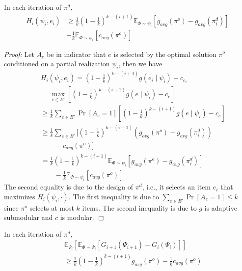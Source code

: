 \documentclass[twoside,leqno,twocolumn]{article}
\begin{document}
\begin{lemma}
\label{lem:a2}
In each iteration of $\pi^d$,
\begin{eqnarray*}
H_i(\psi_i, e_i)&\geq \frac{1}{k}(1-\frac{1}{k})^{k-(i+1)} \mathbb{E}_{\Phi\sim \psi_i}[g_{avg}(\pi^o)-g_{avg}(\pi^d_i)]\\
&-\frac{1}{k}\mathbb{E}_{\Phi\sim \psi_i}[c_{avg}(\pi^o)]
\end{eqnarray*}
\end{lemma}
\emph{Proof:} Let $A_e$ be in indicator that $e$ is selected by the optimal solution $\pi^o$ conditioned on a partial realization $\psi_i$, then we have
\begin{eqnarray*}
&& H_i(\psi_i, e_i) = (1-\frac{1}{k})^{k-(i+1)} g(e_i \mid \psi_i)-c_{e_i}\\
&& = \max_{e\in E'}[(1-\frac{1}{k})^{k-(i+1)} g(e \mid \psi_i)-c_{e}]\\
&& \geq \frac{1}{k}\sum_{e\in E'}\Pr[A_e=1][(1-\frac{1}{k})^{k-(i+1)} g(e \mid \psi_i)-c_{e}]\\
&& \geq \frac{1}{k}\sum_{e\in E'}[(1-\frac{1}{k})^{k-(i+1)} (g_{avg}(\pi^o)-g_{avg}(\pi^d_i))\\
&&\quad\quad-c_{avg}(\pi^o)]\\
&& = \frac{1}{k}(1-\frac{1}{k})^{k-(i+1)} \mathbb{E}_{\Phi\sim \psi_i}[g_{avg}(\pi^o)-g_{avg}(\pi^d_i)]\\
&&\quad\quad-\frac{1}{k}\mathbb{E}_{\Phi\sim \psi_i}[c_{avg}(\pi^o)]
\end{eqnarray*} The second equality is due to the design of $\pi^d$, i.e., it selects an item $e_i$ that maximizes $H_i(\psi_i, \cdot)$. The first inequality is due to $\sum_{e\in E'}\Pr[A_e=1]\leq k$ since $\pi^o$ selects at most $k$ items. The second inequality is due to $g$ is adaptive submodular and $c$ is modular. $\Box$


\begin{lemma}
\label{lem:a3}
In each iteration of $\pi^d$,
\begin{eqnarray*}
&&\mathbb{E}_{\Psi_i}[\mathbb{E}_{\Phi\sim \Psi_i}[G_{i+1}(\Psi_{i+1})- G_{i}(\Psi_i)]] \\
&&\geq \frac{1}{k}(1-\frac{1}{k})^{k-(i+1)}g_{avg}(\pi^o) -\frac{1}{k}c_{avg}(\pi^o)
\end{eqnarray*}
\end{lemma}
\end{document}
